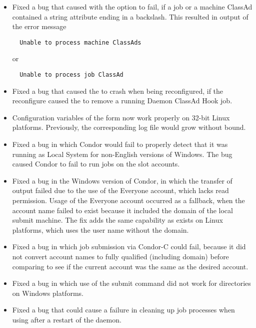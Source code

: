 \begin{itemize}
\item Fixed a bug that caused  with the  option
to fail,
if a job or a machine ClassAd contained a string attribute ending in 
a backslash.
This resulted in output of the error message
\begin{verbatim}
  Unable to process machine ClassAds
\end{verbatim}
or
\begin{verbatim}
  Unable to process job ClassAd
\end{verbatim}

\item Fixed a bug that caused the  to crash when being
reconfigured,
if the reconfigure caused the  to remove 
a running Daemon ClassAd Hook job.

\item Configuration variables of the form 
now work properly on 32-bit Linux platforms.
Previously, the corresponding log file would grow without bound.

\item Fixed a bug in which Condor would fail to properly detect that it 
was running as Local System for non-English versions of Windows.
The bug caused Condor to fail to run jobs on the slot accounts.

\item Fixed a bug in the Windows version of Condor,
in which the transfer of output failed due to the use of the Everyone account,
which lacks read permission.
Usage of the Everyone account occurred as a fallback,
when the account name failed to exist because it
included the domain of the local submit machine.
The fix adds the same capability as exists on Linux platforms,
which uses the user name without the domain.

\item Fixed a bug in which job submission via Condor-C could fail,
because it did not convert account names to fully qualified (including domain)
before comparing to see
if the current account was the same as the desired account.

\item Fixed a bug in which use of the submit command 
 did not work for directories on 
Windows platforms.

\item Fixed a bug that could cause a failure in cleaning up job processes
when using  after a restart of the  daemon.


\end{itemize}
